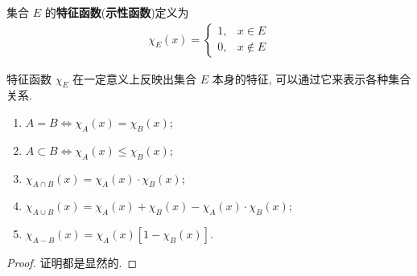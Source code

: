 \documentclass[../../main.tex]{subfiles}
\begin{document}
\begin{definition}
集合 $E$ 的\textbf{特征函数}(\textbf{示性函数})定义为
\begin{align*}
\chi_E(x) = 
\begin{cases}
1, & x \in E\\
0, & x \notin E
\end{cases}
\end{align*}
\end{definition}
\begin{note}
特征函数 $\chi_E$ 在一定意义上反映出集合 $E$ 本身的特征, 可以通过它来表示各种集合关系.
\end{note}

\begin{proposition}[特征函数的基本性质]\label{proposition:特征函数的基本性质}
\begin{enumerate}[(1)]
\item  $A = B \Leftrightarrow \chi_A(x) = \chi_B(x)$; 
\item $A \subset B \Leftrightarrow \chi_A(x) \leqslant \chi_B(x)$;
\item $\chi_{A \cap B}(x) = \chi_A(x) \cdot \chi_B(x)$;
\item $\chi_{A \cup B}(x) = \chi_A(x) + \chi_B(x) - \chi_A(x) \cdot \chi_B(x)$;
\item $\chi_{A - B}(x) = \chi_A(x)[1 - \chi_B(x)]$.
\end{enumerate} 
\end{proposition}
\begin{proof}
证明都是显然的.

\end{proof}
\end{document}
